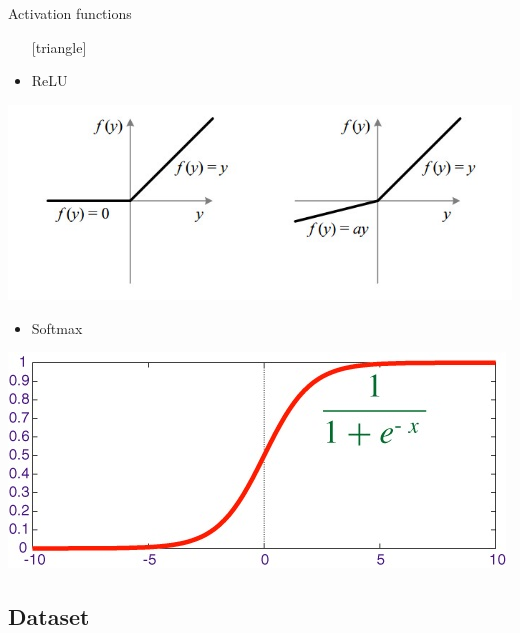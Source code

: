 \documentclass{beamer}
\begin{document}
\begin{frame}{Activation functions}
	\begin{itemize}
		\setlength\itemsep{1em}
		[triangle]
		\item 
			ReLU
	\end{itemize}
	\begin{center}
		\includegraphics[scale=0.2]{ReLU}
	\end{center}
	\begin{itemize}
		\setlength\itemsep{1em}
		[triangle]
		\item 
			Softmax
	\end{itemize}
	\begin{center}
		\includegraphics[scale=0.2]{softmax1}
	\end{center}
\end{frame}

\subsection{Dataset}
\end{document}
